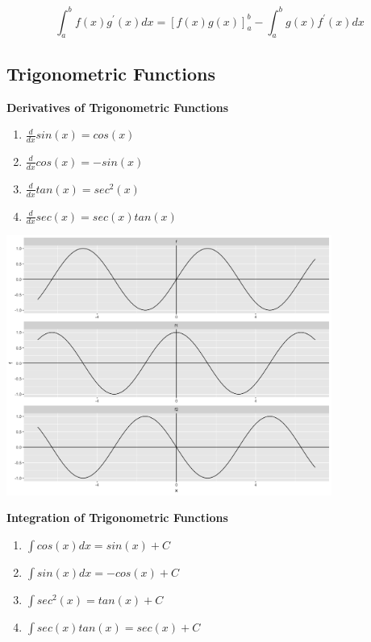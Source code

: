 \documentclass[]{book}
\providecommand{\tightlist}{%
  \setlength{\itemsep}{0pt}\setlength{\parskip}{0pt}}
\begin{document}
\newpage

\[\int_a^b f(x) g^\prime(x)dx=\left [ f(x)g(x) \right ]_a^b-\int_a^b  g(x)f^\prime(x)dx\]

\hypertarget{trigonometric-functions}{%
\subsection{Trigonometric Functions}\label{trigonometric-functions}}

\textbf{Derivatives of Trigonometric Functions}

\begin{enumerate}
\def\labelenumi{\arabic{enumi}.}
\tightlist
\item
  \(\frac{d}{dx} sin(x) = cos(x)\)
\item
  \(\frac{d}{dx} cos(x) = -sin(x)\)
\item
  \(\frac{d}{dx} tan(x) = sec^2(x)\)
\item
  \(\frac{d}{dx} sec(x) = sec(x)tan(x)\)
\end{enumerate}

\begin{center}\includegraphics[width=0.8\textwidth]{figure/unnamed-chunk-20-1} \end{center}

\textbf{Integration of Trigonometric Functions}

\begin{enumerate}
\def\labelenumi{\arabic{enumi}.}
\tightlist
\item
  \(\int cos(x)dx = sin(x) +C\)
\item
  \(\int sin(x)dx = -cos(x) +C\)
\item
  \(\int sec^2(x) = tan(x) +C\)
\item
  \(\int sec(x)tan(x) = sec(x) +C\)
\end{enumerate}
\end{document}
